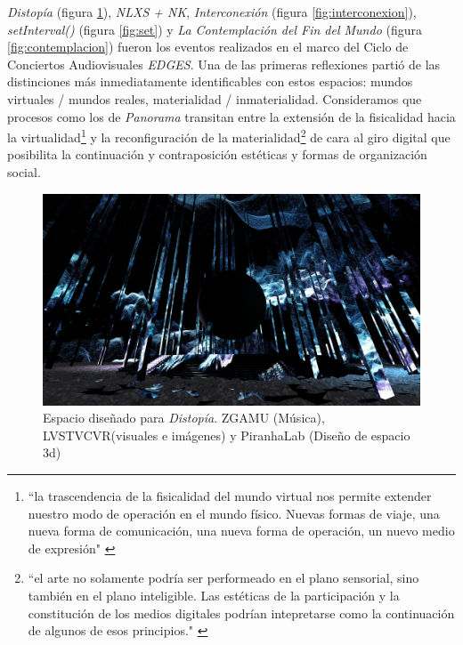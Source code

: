 \textit{Distopía} (figura \ref{fig:distopia}), \textit{NLXS + NK}, \textit{Interconexión} (figura \ref{fig:interconexion}), \textit{setInterval()} (figura \ref{fig:set}) y \textit{La Contemplación del Fin del Mundo} (figura \ref{fig:contemplacion}) fueron los eventos realizados en el marco del Ciclo de Conciertos Audiovisuales \textit{EDGES}. Una de las primeras reflexiones partió de las distinciones más inmediatamente identificables con estos espacios: mundos virtuales / mundos reales, materialidad / inmaterialidad. Consideramos que procesos como los de \textit{Panorama} transitan entre la extensión de la fisicalidad hacia la virtualidad\footnote{``la trascendencia de la fisicalidad del mundo virtual nos permite extender nuestro modo de operación en el mundo físico. Nuevas formas de viaje, una nueva forma de comunicación, una nueva forma de operación, un nuevo medio de expresión" \citep[pp.~49]{cyberspace}}  y la reconfiguración de la materialidad\footnote{``el arte no solamente podría ser performeado en el plano sensorial, sino también en el plano inteligible. Las estéticas de la participación y la constitución de los medios digitales podrían intepretarse como la continuación de algunos de esos principios." \citep[pp.~190]{andreasosa}} de cara al giro digital que posibilita la continuación y contraposición estéticas y formas de organización social. 

\begin{figure}
  \includegraphics[width=\textwidth]{img/figura7.png}
  \caption{Espacio diseñado para \emph{Distopía}. ZGAMU (Música), LVSTVCVR(visuales e imágenes) y PiranhaLab (Diseño de espacio 3d)}
  \label{fig:distopia}
\end{figure}



